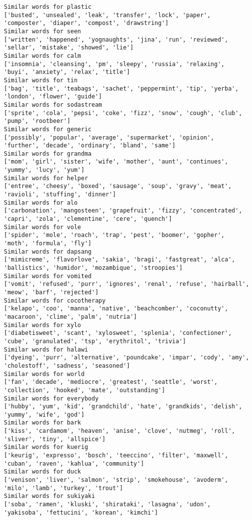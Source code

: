 \documentclass[11pt]{article}
\begin{document}
\begin{Verbatim}[commandchars=\\\{\}]
Similar words for plastic
['busted', 'unsealed', 'leak', 'transfer', 'lock', 'paper', 'composter', 'diaper', 'compost', 'drawstring']
Similar words for seen
['written', 'happened', 'yognaughts', 'jina', 'run', 'reviewed', 'sellar', 'mistake', 'showed', 'lie']
Similar words for calm
['insomnia', 'cleansing', 'pm', 'sleepy', 'russia', 'relaxing', 'buyi', 'anxiety', 'relax', 'title']
Similar words for tin
['bag', 'title', 'teabags', 'sachet', 'peppermint', 'tip', 'yerba', 'london', 'flower', 'guide']
Similar words for sodastream
['sprite', 'cola', 'pepsi', 'coke', 'fizz', 'snow', 'cough', 'club', 'pump', 'rootbeer']
Similar words for generic
['possibly', 'popular', 'average', 'supermarket', 'opinion', 'further', 'decade', 'ordinary', 'bland', 'same']
Similar words for grandma
['mom', 'girl', 'sister', 'wife', 'mother', 'aunt', 'continues', 'yummy', 'lucy', 'yum']
Similar words for helper
['entree', 'cheesy', 'boxed', 'sausage', 'soup', 'gravy', 'meat', 'ravioli', 'stuffing', 'dinner']
Similar words for alo
['carbonation', 'mangosteen', 'grapefruit', 'fizzy', 'concentrated', 'capri', 'zola', 'clementine', 'cere', 'quench']
Similar words for vole
['spider', 'mole', 'roach', 'trap', 'pest', 'boomer', 'gopher', 'moth', 'formula', 'fly']
Similar words for dapsang
['mimicreme', 'flavorlove', 'sakia', 'bragi', 'fastgreat', 'alca', 'ballistics', 'humidor', 'mozambique', 'stroopies']
Similar words for vomited
['vomit', 'refused', 'purr', 'ignores', 'renal', 'refuse', 'hairball', 'meow', 'barf', 'rejected']
Similar words for cocotherapy
['kelapo', 'coo', 'manna', 'native', 'beachcomber', 'coconutty', 'macaroon', 'clime', 'palm', 'nutria']
Similar words for xylo
['diabetisweet', 'scant', 'xylosweet', 'splenia', 'confectioner', 'cube', 'granulated', 'tsp', 'erythritol', 'trivia']
Similar words for halawi
['dyeing', 'purr', 'alternative', 'poundcake', 'impar', 'cody', 'amy', 'cholestoff', 'sadness', 'seasoned']
Similar words for world
['fan', 'decade', 'mediocre', 'greatest', 'seattle', 'worst', 'collection', 'hooked', 'mate', 'outstanding']
Similar words for everybody
['hubby', 'yum', 'kid', 'grandchild', 'hate', 'grandkids', 'delish', 'yummy', 'wife', 'god']
Similar words for bark
['kiss', 'cardamom', 'heaven', 'anise', 'clove', 'nutmeg', 'roll', 'sliver', 'tiny', 'allspice']
Similar words for kuerig
['keurig', 'expresso', 'bosch', 'teeccino', 'filter', 'maxwell', 'cuban', 'raven', 'kahlua', 'community']
Similar words for duck
['venison', 'liver', 'salmon', 'strip', 'smokehouse', 'avoderm', 'milo', 'lamb', 'turkey', 'trout']
Similar words for sukiyaki
['soba', 'ramen', 'kluski', 'shirataki', 'lasagna', 'udon', 'yakisoba', 'fettucini', 'korean', 'kimchi']

\end{Verbatim}
\end{document}

